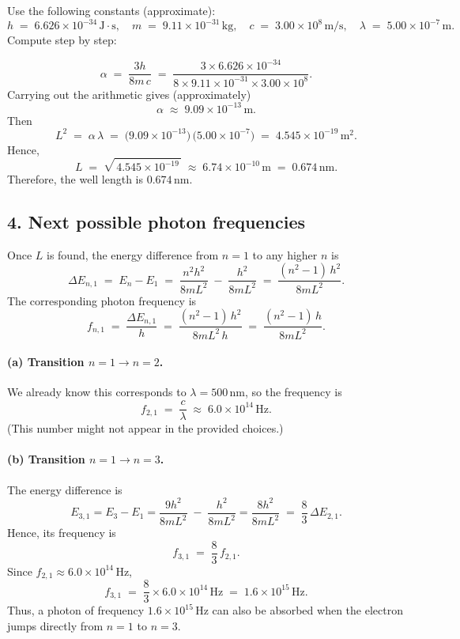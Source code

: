 \documentclass[12pt]{article}
\theoremstyle{definition} %
\theoremstyle{plain} %
\begin{document}
Use the following constants (approximate):
\[
   h \;=\; 6.626\times 10^{-34}\,\mathrm{J\cdot s}, 
   \quad
   m \;=\; 9.11\times 10^{-31}\,\mathrm{kg},
   \quad
   c \;=\; 3.00\times 10^{8}\,\mathrm{m/s},
   \quad
   \lambda \;=\; 5.00\times 10^{-7}\,\mathrm{m}.
\]
Compute step by step:

\[
   \alpha 
   \;=\; \frac{3h}{8 m\,c}
   \;=\; \frac{3 \times 6.626\times 10^{-34}}{8 \times 9.11\times 10^{-31} \times 3.00\times 10^{8}}.
\]
Carrying out the arithmetic gives (approximately)
\[
   \alpha \;\approx\; 9.09\times 10^{-13}\,\mathrm{m}.
\]
Then
\[
   L^2 
   \;=\; \alpha\,\lambda 
   \;=\; \bigl(9.09\times 10^{-13}\bigr)\,\bigl(5.00\times 10^{-7}\bigr)
   \;=\; 4.545\times 10^{-19}\,\mathrm{m}^2.
\]
Hence,
\[
   L \;=\; \sqrt{\,4.545\times 10^{-19}\,}
       \;\approx\; 6.74\times 10^{-10}\,\mathrm{m}
       \;=\; 0.674\,\mathrm{nm}.
\]
Therefore, the well length is $\boxed{0.674\,\text{nm}}$.

\subsection*{4. Next possible photon frequencies}

Once $L$ is found, the energy difference from $n=1$ to any higher $n$ is
\[
   \Delta E_{n,1} \;=\; E_n - E_1 
   \;=\; \frac{n^2 h^2}{8 m L^2} \;-\; \frac{h^2}{8 m L^2}
   \;=\; \frac{(n^2 - 1)\,h^2}{8 m L^2}.
\]
The corresponding photon frequency is
\[
   f_{n,1} \;=\; \frac{\Delta E_{n,1}}{h} 
   \;=\; \frac{(n^2 - 1)\,h^2}{8 m L^2 \,h} 
   \;=\; \frac{(n^2 - 1)\,h}{8 m L^2}.
\]

\paragraph{(a) Transition $n=1 \to n=2$.} 
We already know this corresponds to $\lambda = 500\,\mathrm{nm}$, 
so the frequency is 
\[
   f_{2,1} \;=\; \frac{c}{\lambda} \;\approx\; 6.0\times 10^{14}\,\mathrm{Hz}.
\]
(This number might not appear in the provided choices.)

\paragraph{(b) Transition $n=1 \to n=3$.} 
The energy difference is 
\[
   E_{3,1} = E_3 - E_1 
   = \frac{9h^2}{8mL^2} \;-\; \frac{h^2}{8mL^2} 
   = \frac{8h^2}{8mL^2} \;=\; \frac{8}{3}\,\Delta E_{2,1}.
\]
Hence, its frequency is
\[
   f_{3,1} \;=\; \frac{8}{3} \, f_{2,1}.
\]
Since $f_{2,1}\approx 6.0\times 10^{14}\,\mathrm{Hz}$,
\[
   f_{3,1} \;=\; \frac{8}{3} \times 6.0\times 10^{14}\,\mathrm{Hz}
            \;=\; 1.6\times 10^{15}\,\mathrm{Hz}.
\]
Thus, a photon of frequency $\boxed{1.6\times 10^{15}\,\mathrm{Hz}}$ can also be absorbed 
when the electron jumps directly from $n=1$ to $n=3$.
\end{document}
